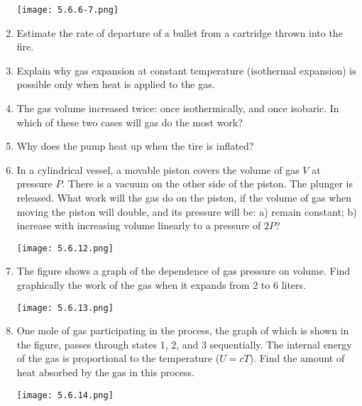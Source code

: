 \documentclass{article}
\begin{document}
\begin{enumerate}[label=5.6.\arabic*]
\begin{center}
    \texttt{[image: 5.6.6-7.png]}
\end{center}


\item Estimate the rate of departure of a bullet from a cartridge thrown into the fire.

\item Explain why gas expansion at constant temperature (isothermal expansion) is possible only when heat is applied to the gas.

\item The gas volume increased twice: once isothermically, and once isobaric. In which of these two cases will gas do the most work?

\item Why does the pump heat up when the tire is inflated?

\item In a cylindrical vessel, a movable piston covers the volume of gas $V$ at pressure $P$. There is a vacuum on the other side of the piston. The plunger is released. What work will the gas do on the piston, if the volume of gas when moving the piston will double, and its pressure will be: 
a) remain constant; 
b) increase with increasing volume linearly to a pressure of $2P$?

\begin{center}
    \texttt{[image: 5.6.12.png]}
\end{center}


\item The figure shows a graph of the dependence of gas pressure on volume. Find graphically the work of the gas when it expands from $2$ to $6$ liters.

\begin{center}
    \texttt{[image: 5.6.13.png]}
\end{center}


\item One mole of gas participating in the process, the graph of which is shown in the figure, passes through states 1, 2, and 3 sequentially. The internal energy of the gas is proportional to the temperature ($U = cT$). Find the amount of heat absorbed by the gas in this process.

\begin{center}
    \texttt{[image: 5.6.14.png]}
\end{center}



\end{enumerate}
\end{document}
